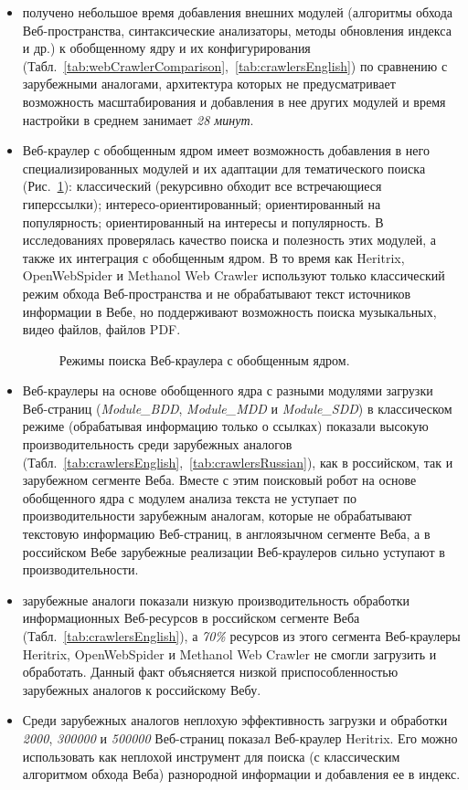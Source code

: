 \begin{itemize}
	\item получено небольшое время добавления внешних модулей (алгоритмы обхода Веб-пространства, синтаксические анализаторы, методы обновления индекса и др.) к обобщенному ядру и их конфигурирования (Табл.~\cref{tab:webCrawlerComparison},~\cref{tab:crawlersEnglish}) по сравнению с зарубежными аналогами, архитектура которых не предусматривает возможность масштабирования и добавления в нее других модулей и время настройки в среднем занимает \textit{28 минут}.
	\item Веб-краулер с обобщенным ядром имеет возможность добавления в него специализированных модулей и их адаптации для тематического поиска (Рис.~\cref{fig:crawlerModes}): классический (рекурсивно обходит все встречающиеся гиперссылки); интересо-ориентированный; ориентированный на популярность; ориентированный на интересы и популярность. В исследованиях \cite{BlekanovBondarenko1,BlekanovBondarenko2} проверялась качество поиска и полезность этих модулей, а также их интеграция с обобщенным ядром. В то время как Heritrix, OpenWebSpider и Methanol Web Crawler используют только классический режим обхода Веб-пространства и не обрабатывают текст источников информации в Вебе, но поддерживают возможность поиска музыкальных, видео файлов, файлов PDF.
	
	\begin{figure}[ht]
		\caption{Режимы поиска Веб-краулера с обобщенным ядром.}\label{fig:crawlerModes}
	\end{figure}
	
	\item Веб-краулеры на основе обобщенного ядра с разными модулями загрузки Веб-страниц (\textit{Module\_BDD}, \textit{Module\_MDD} и \textit{Module\_SDD}) в классическом режиме (обрабатывая информацию только о ссылках) показали высокую производительность среди зарубежных аналогов (Табл.~\cref{tab:crawlersEnglish},~\cref{tab:crawlersRussian}), как в российском, так и зарубежном сегменте Веба. Вместе с этим поисковый робот на основе обобщенного ядра с модулем анализа текста не уступает по производительности зарубежным аналогам, которые не обрабатывают текстовую информацию Веб-страниц, в англоязычном сегменте Веба, а в российском Вебе зарубежные реализации Веб-краулеров сильно уступают в производительности. 
	\item зарубежные аналоги показали низкую производительность обработки информационных Веб-ресурсов в российском сегменте Веба (Табл.~\cref{tab:crawlersEnglish}), а \textit{70\%} ресурсов из этого сегмента Веб-краулеры Heritrix, OpenWebSpider и Methanol Web Crawler не смогли загрузить и обработать. Данный факт объясняется низкой приспособленностью зарубежных аналогов к российскому Вебу.
	\item Среди зарубежных аналогов неплохую эффективность загрузки и обработки \textit{2000}, \textit{300000} и \textit{500000} Веб-страниц показал Веб-краулер Heritrix. Его можно использовать как неплохой инструмент для поиска (с классическим алгоритмом обхода Веба) разнородной информации и добавления ее в индекс.
\end{itemize}

